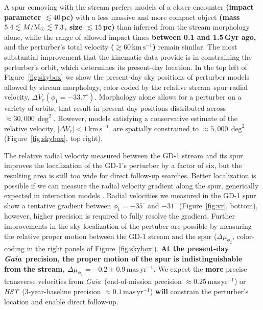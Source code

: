 \documentclass[twocolumn]{aastex63}
\newcommand{\gaia}{\textsl{Gaia}}
\newcommand{\hst}{\textsl{HST}}
\newcommand{\kms}{\ensuremath{\textrm{km}\,\textrm{s}^{-1}}}
\newcommand{\masyr}{\ensuremath{\textrm{mas}\,\textrm{yr}^{-1}}}
\newcommand{\changes}[1]{{\textbf{#1}}}
\begin{document}
A spur comoving with the stream prefers models of a closer encounter \changes{(impact parameter $\lesssim40\,$pc)} with a less massive and more compact object \changes{(mass $5.4\lesssim M/\rm M_\odot \lesssim7.3$, size $\lesssim15\,$pc)} than inferred from the stream morphology alone, while the range of allowed impact times \changes{between 0.1 and 1.5\,Gyr ago,} and the perturber's total velocity \changes{($\gtrsim60\,\kms$)} remain similar.
The most substantial improvement that the kinematic data provide is in constraining the perturber's orbit, which determines its present-day location.
In the top left of Figure~\ref{fig:skybox} we show the present-day sky positions of perturber models allowed by stream morphology, color-coded by the relative stream--spur radial velocity, $\Delta V_r(\phi_1=-33.7^\circ)$.
Morphology alone allows for a perturber on a variety of orbits, that result in present-day positions distributed across $\approx30,000\,\deg^2$.
However, models satisfying a conservative estimate of the relative velocity, $|\Delta V_r|<1\,\kms$, are spatially constrained to $\approx5,000\,\deg^2$ (Figure~\ref{fig:skybox}, top right).

The relative radial velocity measured between the GD-1 stream and its spur improves the localization of the GD-1's perturber by a factor of six, but the resulting area is still too wide for direct follow-up searches.
Better localization is possible if we can measure the radial velocity gradient along the spur, generically expected in interaction models \citep{bonaca2019a}.
Radial velocities we measured in the GD-1 spur show a tentative gradient between $\phi_1=-35^\circ$ and $-31^\circ$ (Figure~\ref{fig:vr}, bottom), however, higher precision is required to fully resolve the gradient.
Further improvements in the sky localization of the pertuber are possible by measuring the relative proper motion between the GD-1 stream and the spur ($\Delta\mu_{\phi_2}$, color-coding in the right panels of Figure~\ref{fig:skybox}).
\changes{At the present-day \gaia\ precision, the proper motion of the spur is indistinguishable from the stream, $\Delta\mu_{\phi_2}=-0.2\pm0.9\,\masyr$.}
We expect the \changes{more} precise transverse velocities from \gaia\ (end-of-mission precision $\approx0.25\,\masyr$) or \hst\ (3-year-baseline precision $\approx0.1\,\masyr$) \changes{will} constrain the perturber's location and enable direct follow-up.
\end{document}

